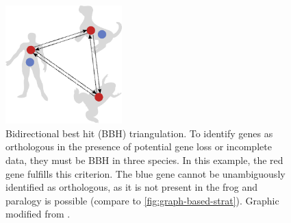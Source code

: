 \begin{figure}[t]
	\centering
	\includegraphics[width=0.4\textwidth]{img/triangulation-bbh.pdf}
	\caption[Triangulation of bidirectional best hits]{
		Bidirectional best hit (BBH) triangulation. To identify genes as orthologous
		in the presence of potential gene loss or incomplete data, they must be BBH
		in three species.  In this example, the red gene fulfills this criterion.
		The blue gene cannot be unambiguously identified as orthologous, as it is
		not present in the frog and paralogy is possible (compare to
		\autoref{fig:graph-based-strat}).  Graphic modified from
		\citet{altenhoff2012}.
	}
	\label{fig:triangulation-bbh}
\end{figure}

